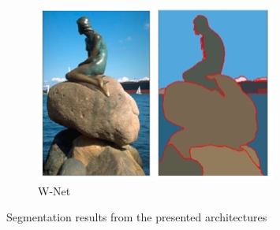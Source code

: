 \begin{figure}
    \hfill
    \begin{subfigure}{0.21\textwidth}
        \includegraphics[width=\textwidth]{images/segmentation_example_wnet}
        \caption{W-Net~\cite{wnet17}}
        \label{fig:exseg_wnet}
    \end{subfigure}
    \hfill
    \caption{Segmentation results from the presented architectures}
    \label{fig:segmentation_examples}
\end{figure}


\newpage